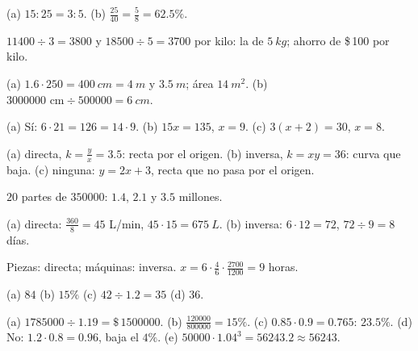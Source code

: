 \documentclass[11pt,a4paper]{article}
\newcommand{\pesos}[1]{\$\,\num{#1}}
\begin{document}
\respuestas
\begin{respuestascortas}
\begin{soluciones}
\item (a) $15:25=3:5$. (b) $\tfrac{25}{40}=\tfrac58=62.5\%$.
\item $\num{11400}\div3=\num{3800}$ y $\num{18500}\div5=\num{3700}$ por kilo: la de $\SI{5}{kg}$; ahorro de \pesos{100} por kilo.
\item (a) $1.6\cdot250=\SI{400}{cm}=\SI{4}{m}$ y $\SI{3.5}{m}$; área $\SI{14}{m^2}$. (b) $\num{3000000}\text{ cm}\div\num{500000}=\SI{6}{cm}$.
\item (a) Sí: $6\cdot21=126=14\cdot9$. (b) $15x=135$, $x=9$. (c) $3(x+2)=30$, $x=8$.
\item (a) directa, $k=\tfrac yx=3.5$: recta por el origen. (b) inversa, $k=xy=36$: curva que baja. (c) ninguna: $y=2x+3$,
      recta que no pasa por el origen.
\item $20$ partes de $\num{350000}$: $1.4$, $2.1$ y $3.5$ millones.
\item (a) directa: $\tfrac{360}{8}=45$ L/min, $45\cdot15=\SI{675}{L}$. (b) inversa: $6\cdot12=72$, $72\div9=8$ días.
\item Piezas: directa; máquinas: inversa. $x=6\cdot\tfrac46\cdot\tfrac{2700}{1200}=9$ horas.
\item (a) $84$ (b) $15\%$ (c) $42\div1.2=35$ (d) $36$.
\item (a) $\num{1785000}\div1.19=\pesos{1500000}$. (b) $\tfrac{120000}{800000}=15\%$. (c) $0.85\cdot0.9=0.765$: $23.5\%$.
      (d) No: $1.2\cdot0.8=0.96$, baja el $4\%$. (e) $\num{50000}\cdot1.04^3=\num{56243.2}\approx\num{56243}$.
\end{soluciones}
\end{respuestascortas}
\end{document}
